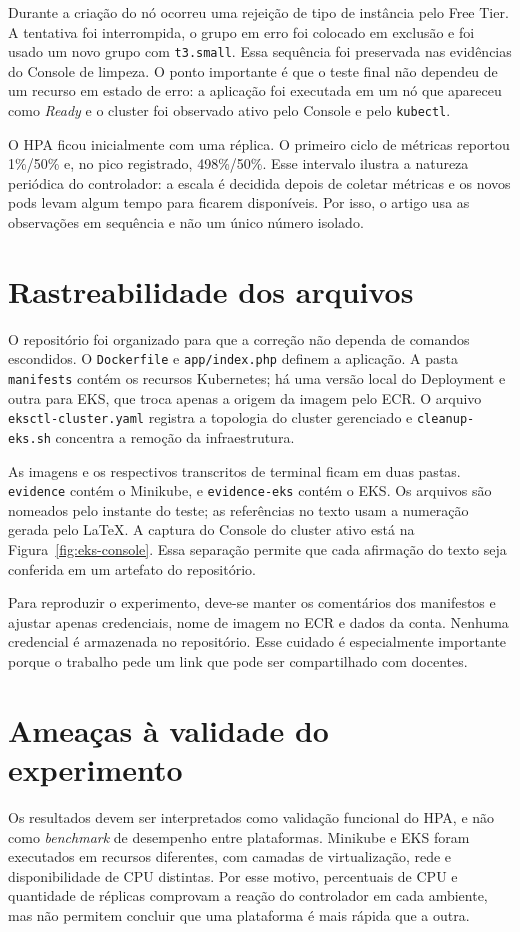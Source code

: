 \documentclass[conference]{IEEEtran}
\begin{document}
Durante a criação do nó ocorreu uma rejeição de tipo de instância pelo Free Tier. A tentativa foi interrompida, o grupo em erro foi colocado em exclusão e foi usado um novo grupo com \texttt{t3.small}. Essa sequência foi preservada nas evidências do Console de limpeza. O ponto importante é que o teste final não dependeu de um recurso em estado de erro: a aplicação foi executada em um nó que apareceu como \textit{Ready} e o cluster foi observado ativo pelo Console e pelo \texttt{kubectl}.

O HPA ficou inicialmente com uma réplica. O primeiro ciclo de métricas reportou 1\%/50\% e, no pico registrado, 498\%/50\%. Esse intervalo ilustra a natureza periódica do controlador: a escala é decidida depois de coletar métricas e os novos pods levam algum tempo para ficarem disponíveis. Por isso, o artigo usa as observações em sequência e não um único número isolado.

\section{Rastreabilidade dos arquivos}
O repositório foi organizado para que a correção não dependa de comandos escondidos. O \texttt{Dockerfile} e \texttt{app/index.php} definem a aplicação. A pasta \texttt{manifests} contém os recursos Kubernetes; há uma versão local do Deployment e outra para EKS, que troca apenas a origem da imagem pelo ECR. O arquivo \texttt{eksctl-cluster.yaml} registra a topologia do cluster gerenciado e \texttt{cleanup-eks.sh} concentra a remoção da infraestrutura.

As imagens e os respectivos transcritos de terminal ficam em duas pastas. \texttt{evidence} contém o Minikube, e \texttt{evidence-eks} contém o EKS. Os arquivos são nomeados pelo instante do teste; as referências no texto usam a numeração gerada pelo LaTeX. A captura do Console do cluster ativo está na Figura~\ref{fig:eks-console}. Essa separação permite que cada afirmação do texto seja conferida em um artefato do repositório.

Para reproduzir o experimento, deve-se manter os comentários dos manifestos e ajustar apenas credenciais, nome de imagem no ECR e dados da conta. Nenhuma credencial é armazenada no repositório. Esse cuidado é especialmente importante porque o trabalho pede um link que pode ser compartilhado com docentes.

\section{Ameaças à validade do experimento}
Os resultados devem ser interpretados como validação funcional do HPA, e não como \textit{benchmark} de desempenho entre plataformas. Minikube e EKS foram executados em recursos diferentes, com camadas de virtualização, rede e disponibilidade de CPU distintas. Por esse motivo, percentuais de CPU e quantidade de réplicas comprovam a reação do controlador em cada ambiente, mas não permitem concluir que uma plataforma é mais rápida que a outra.
\end{document}
